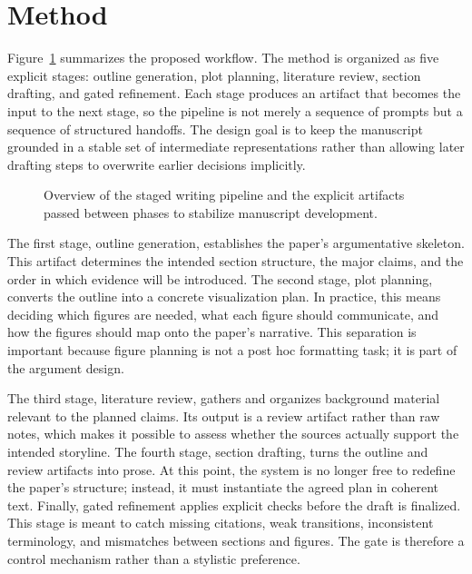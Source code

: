\documentclass{article}
\begin{document}
\section{Method}

Figure~\cref{fig:pipeline} summarizes the proposed workflow. The method is organized as five explicit stages: outline generation, plot planning, literature review, section drafting, and gated refinement. Each stage produces an artifact that becomes the input to the next stage, so the pipeline is not merely a sequence of prompts but a sequence of structured handoffs. The design goal is to keep the manuscript grounded in a stable set of intermediate representations rather than allowing later drafting steps to overwrite earlier decisions implicitly.

\begin{figure}[t]
  \centering
  
  \caption{Overview of the staged writing pipeline and the explicit artifacts passed between phases to stabilize manuscript development.}
  \label{fig:pipeline}
\end{figure}

The first stage, outline generation, establishes the paper's argumentative skeleton. This artifact determines the intended section structure, the major claims, and the order in which evidence will be introduced. The second stage, plot planning, converts the outline into a concrete visualization plan. In practice, this means deciding which figures are needed, what each figure should communicate, and how the figures should map onto the paper's narrative. This separation is important because figure planning is not a post hoc formatting task; it is part of the argument design.

The third stage, literature review, gathers and organizes background material relevant to the planned claims. Its output is a review artifact rather than raw notes, which makes it possible to assess whether the sources actually support the intended storyline. The fourth stage, section drafting, turns the outline and review artifacts into prose. At this point, the system is no longer free to redefine the paper's structure; instead, it must instantiate the agreed plan in coherent text. Finally, gated refinement applies explicit checks before the draft is finalized. This stage is meant to catch missing citations, weak transitions, inconsistent terminology, and mismatches between sections and figures. The gate is therefore a control mechanism rather than a stylistic preference.
\end{document}
